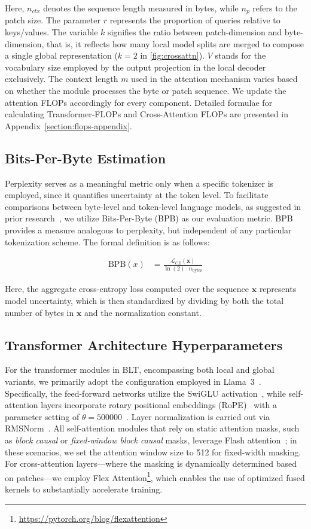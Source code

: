 Here, $n_{ctx}$ denotes the sequence length measured in bytes, while $n_p$ refers to the patch size. The parameter $r$ represents the proportion of queries relative to keys/values. The variable $k$ signifies the ratio between patch-dimension and byte-dimension, that is, it reflects how many local model splits are merged to compose a single global representation ($k=2$ in \autoref{fig:crossattn}). $V$ stands for the vocabulary size employed by the output projection in the local decoder exclusively. The context length $m$ used in the attention mechanism varies based on whether the module processes the byte or patch sequence. We update the attention FLOPs accordingly for every component. Detailed formulae for calculating Transformer-FLOPs and Cross-Attention FLOPs are presented in Appendix~\ref{section:flops-appendix}.

\subsection{Bits-Per-Byte Estimation} Perplexity serves as a meaningful metric only when a specific tokenizer is employed, since it quantifies uncertainty at the token level. To facilitate comparisons between byte-level and token-level language models, as suggested in prior research~\citep{xue2022byt5, yu2023megabyte, wang2024mambabyte}, we utilize Bits-Per-Byte (BPB) as our evaluation metric. BPB provides a measure analogous to perplexity, but independent of any particular tokenization scheme. The formal definition is as follows:

\begin{align}
    \text{BPB}(x)&= \frac{\mathcal{L}_{CE}(\pmb{x})}{\ln(2)\cdot n_{\text{bytes}}}
\end{align}

Here, the aggregate cross-entropy loss computed over the sequence $\pmb{x}$ represents model uncertainty, which is then standardized by dividing by both the total number of bytes in $\pmb{x}$ and the normalization constant.

\subsection{Transformer Architecture Hyperparameters}  
For the transformer modules in {\textsc BLT}, encompassing both local and global variants, we primarily adopt the configuration employed in Llama~3~\citep{dubey2024llama}. Specifically, the feed-forward networks utilize the SwiGLU activation~\citep{swiglu}, while self-attention layers incorporate rotary positional embeddings (RoPE)~\citep{RoPe} with a parameter setting of $\theta=500000$~\citep{xiong2024effective}. Layer normalization is carried out via RMSNorm~\citep{RMSNorm}. All self-attention modules that rely on static attention masks, such as \textit{block causal} or \textit{fixed-window block causal} masks, leverage Flash attention~\citep{dao2022flashattention}; in these scenarios, we set the attention window size to 512 for fixed-width masking. For cross-attention layers—where the masking is dynamically determined based on patches—we employ Flex Attention\footnote{\url{https://pytorch.org/blog/flexattention}}, which enables the use of optimized fused kernels to substantially accelerate training.

